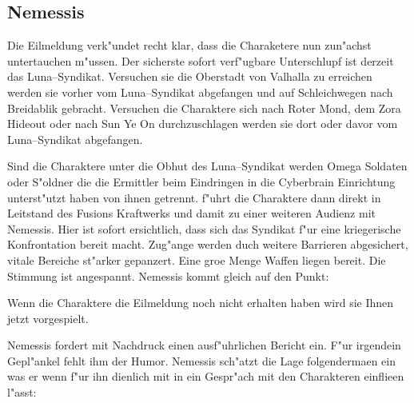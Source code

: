 \subsection{Nemessis} 
Die Eilmeldung verk"undet recht klar, dass die Charaketere nun zun"achst untertauchen m"ussen. Der sicherste sofort verf"ugbare Unterschlupf ist derzeit das Luna--Syndikat. Versuchen sie die Oberstadt von Valhalla zu erreichen werden sie vorher vom Luna--Syndikat abgefangen und auf Schleichwegen nach Breidablik gebracht. Versuchen die Charaktere sich nach Roter Mond, dem Zora Hideout oder nach Sun Ye On durchzuschlagen werden sie dort oder davor vom Luna--Syndikat abgefangen.

Sind die Charaktere unter die Obhut des Luna--Syndikat werden Omega Soldaten oder S"oldner die die Ermittler beim Eindringen in die Cyberbrain Einrichtung unterst"utzt haben von ihnen getrennt. \xl{} f"uhrt die Charaktere dann direkt in Leitstand des Fusions Kraftwerks und damit zu einer weiteren Audienz mit Nemessis. Hier ist sofort ersichtlich, dass sich das Syndikat f"ur eine kriegerische Konfrontation bereit macht. Zug"ange werden duch weitere Barrieren abgesichert, vitale Bereiche st"arker gepanzert. Eine gro\3e Menge Waffen liegen bereit. Die Stimmung ist angespannt. Nemessis kommt gleich auf den Punkt: 


Wenn die Charaktere die Eilmeldung noch nicht erhalten haben wird sie Ihnen jetzt vorgespielt.


Nemessis fordert mit Nachdruck einen ausf"uhrlichen Bericht ein. F"ur irgendein Gepl"ankel fehlt ihm der Humor. Nemessis sch"atzt die Lage folgenderma\3en ein was er wenn f"ur ihn dienlich mit in ein Gespr"ach mit den Charakteren einflie\3en l"asst:

